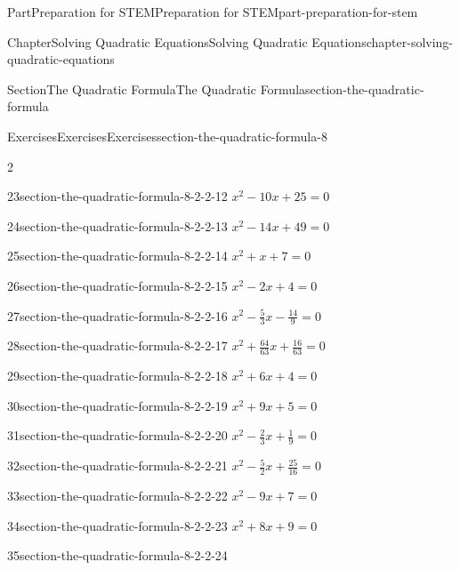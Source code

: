 \documentclass[twoside,10pt,]{book}
\numberwithin{equation}{section}
\begin{document}
\begin{partptx}{Part}{Preparation for STEM}{}{Preparation for STEM}{}{}{part-preparation-for-stem}
\begin{chapterptx}{Chapter}{Solving Quadratic Equations}{}{Solving Quadratic Equations}{}{}{chapter-solving-quadratic-equations}
\begin{sectionptx}{Section}{The Quadratic Formula}{}{The Quadratic Formula}{}{}{section-the-quadratic-formula}
\begin{exercises-subsection}{Exercises}{Exercises}{}{Exercises}{}{}{section-the-quadratic-formula-8}
\begin{exercisegroupcol}{2}
\begin{divisionexerciseegcol}{23}{}{}{section-the-quadratic-formula-8-2-2-12}
\({x^{2}-10x+25}=0\)%
\end{divisionexerciseegcol}%
\begin{divisionexerciseegcol}{24}{}{}{section-the-quadratic-formula-8-2-2-13}%
\({x^{2}-14x+49}=0\)%
\end{divisionexerciseegcol}%
\begin{divisionexerciseegcol}{25}{}{}{section-the-quadratic-formula-8-2-2-14}%
\({x^{2}+x+7}=0\)%
\end{divisionexerciseegcol}%
\begin{divisionexerciseegcol}{26}{}{}{section-the-quadratic-formula-8-2-2-15}%
\({x^{2}-2x+4}=0\)%
\end{divisionexerciseegcol}%
\begin{divisionexerciseegcol}{27}{}{}{section-the-quadratic-formula-8-2-2-16}%
\({x^{2} - {\frac{5}{3}}x - {\frac{14}{9}}}=0\)%
\end{divisionexerciseegcol}%
\begin{divisionexerciseegcol}{28}{}{}{section-the-quadratic-formula-8-2-2-17}%
\({x^{2}+{\frac{64}{63}}x+{\frac{16}{63}}}=0\)%
\end{divisionexerciseegcol}%
\begin{divisionexerciseegcol}{29}{}{}{section-the-quadratic-formula-8-2-2-18}%
\({x^{2}+6x+4}=0\)%
\end{divisionexerciseegcol}%
\begin{divisionexerciseegcol}{30}{}{}{section-the-quadratic-formula-8-2-2-19}%
\({x^{2}+9x+5}=0\)%
\end{divisionexerciseegcol}%
\begin{divisionexerciseegcol}{31}{}{}{section-the-quadratic-formula-8-2-2-20}%
\({x^{2} - {\frac{2}{3}}x+{\frac{1}{9}}}=0\)%
\end{divisionexerciseegcol}%
\begin{divisionexerciseegcol}{32}{}{}{section-the-quadratic-formula-8-2-2-21}%
\({x^{2} - {\frac{5}{2}}x+{\frac{25}{16}}}=0\)%
\end{divisionexerciseegcol}%
\begin{divisionexerciseegcol}{33}{}{}{section-the-quadratic-formula-8-2-2-22}%
\({x^{2}-9x+7}=0\)%
\end{divisionexerciseegcol}%
\begin{divisionexerciseegcol}{34}{}{}{section-the-quadratic-formula-8-2-2-23}%
\({x^{2}+8x+9}=0\)%
\end{divisionexerciseegcol}%
\begin{divisionexerciseegcol}{35}{}{}{section-the-quadratic-formula-8-2-2-24}%

\end{divisionexerciseegcol}
\end{exercisegroupcol}
\end{exercises-subsection}
\end{sectionptx}
\end{chapterptx}
\end{partptx}
\end{document}

